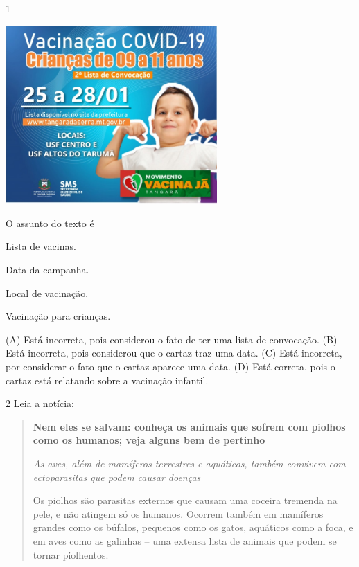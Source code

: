 
\num{1}

\includegraphics[width=3.17910in,height=2.68418in]{media/image124.jpeg}


O assunto do texto é

\begin{escolha}
\item Lista de vacinas.

\item Data da campanha.

\item Local de vacinação.

\item Vacinação para crianças.
\end{escolha}


(A) Está incorreta, pois considerou o fato de ter uma lista de convocação.
(B) Está incorreta, pois considerou que o cartaz traz uma data.
(C) Está incorreta, por considerar o fato que o cartaz aparece uma data.
(D) Está correta, pois o cartaz está relatando sobre a vacinação infantil.

\num{2} Leia a notícia:

\begin{quote}
\textbf{Nem eles se salvam: conheça os animais que sofrem com piolhos
como os humanos; veja alguns bem de pertinho}

\textit{As aves, além de mamíferos terrestres e aquáticos, também convivem com
ectoparasitas que podem causar doenças}

Os piolhos são parasitas externos que causam uma coceira tremenda na
pele, e não atingem só os humanos. Ocorrem também em mamíferos grandes
como os búfalos, pequenos como os gatos, aquáticos como a foca, e em
aves como as galinhas -- uma extensa lista de animais que podem se
tornar piolhentos.
\end{quote}

